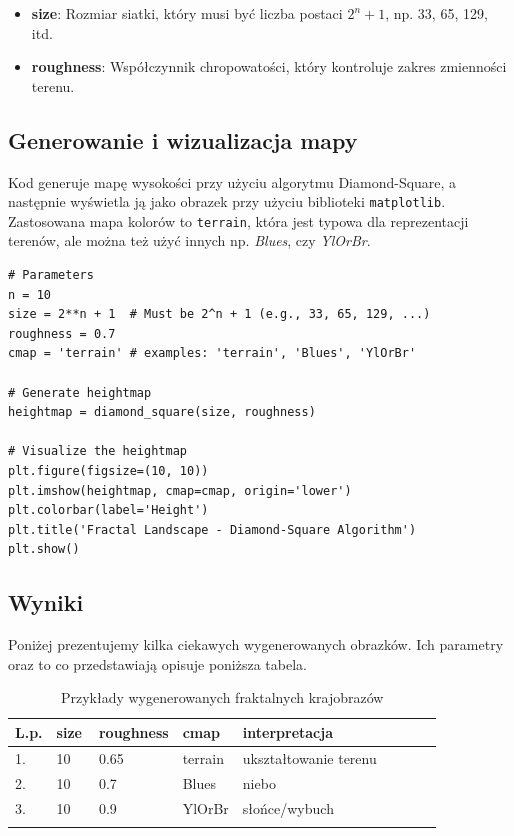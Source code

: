 \documentclass{article}
\begin{document}
\begin{itemize}
    \item \textbf{size}: Rozmiar siatki, który musi być liczba postaci \(2^n + 1\), np. 33, 65, 129, itd.
    \item \textbf{roughness}: Współczynnik chropowatości, który kontroluje zakres zmienności terenu.
\end{itemize}

\subsection*{Generowanie i wizualizacja mapy}

Kod generuje mapę wysokości przy użyciu algorytmu Diamond-Square, a następnie wyświetla ją jako obrazek przy użyciu biblioteki \texttt{matplotlib}. Zastosowana mapa kolorów to \texttt{terrain}, która jest typowa dla reprezentacji terenów, ale można też użyć innych np. \textit{Blues}, czy \textit{YlOrBr}.

\begin{verbatim}
# Parameters
n = 10
size = 2**n + 1  # Must be 2^n + 1 (e.g., 33, 65, 129, ...)
roughness = 0.7
cmap = 'terrain' # examples: 'terrain', 'Blues', 'YlOrBr'

# Generate heightmap
heightmap = diamond_square(size, roughness)

# Visualize the heightmap
plt.figure(figsize=(10, 10))
plt.imshow(heightmap, cmap=cmap, origin='lower')
plt.colorbar(label='Height')
plt.title('Fractal Landscape - Diamond-Square Algorithm')
plt.show()
\end{verbatim}

\newpage

\subsection{Wyniki}

Poniżej prezentujemy kilka ciekawych wygenerowanych obrazków. Ich parametry oraz to co przedstawiają opisuje poniższa tabela. \\

\begin{longtable}{|p{0.05\linewidth}|p{0.1\linewidth}|p{0.1\linewidth}|p{0.1\linewidth}|p{0.5\linewidth}|}
    \hline
    \textbf{L.p.} & \textbf{size} & \textbf{roughness} & \textbf{cmap} & \textbf{interpretacja}\\
    \hline
    \endhead
    1. & 10 & 0.65 & terrain & ukształtowanie terenu \\
    \hline
    2. & 10 & 0.7 & Blues & niebo \\
    \hline
    3. & 10 & 0.9 & YlOrBr & słońce/wybuch \\
    \hline
\caption{Przykłady wygenerowanych fraktalnych krajobrazów}
\end{longtable}
\end{document}
